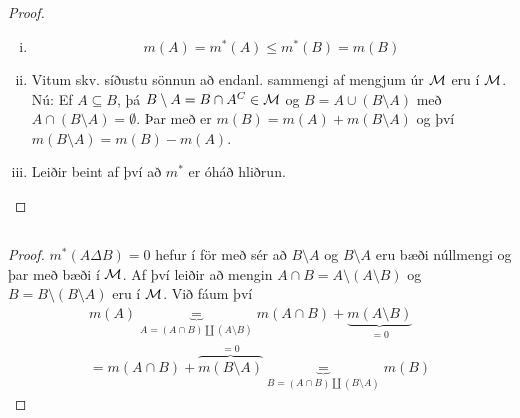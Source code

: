 \documentclass[12pt]{book} \usepackage[utf8]{inputenc}
\begin{document}
        \subsection{}
        \begin{proof}
          \begin{enumerate}[(i)]
          \item \[ m(A) = m^*(A) \leq m^*(B) = m(B) \]
          \item Vitum skv. síðustu sönnun að endanl. sammengi af
            mengjum úr $\mathcal{M}$ eru í $\mathcal{M}$.  Nú: Ef $A \subseteq B$,
            þá $B \setminus A = B \cap A^C \in \mathcal{M}$ og
            $B = A \cup (B \setminus A)$ með
            $A \cap (B \setminus A) = \emptyset$.  Þar með er
            $m(B) = m(A) + m(B \setminus A)$ og því
            $m(B \setminus A) = m(B) - m(A)$.

          \item Leiðir beint af því að $m^*$ er óháð hliðrun.
          \end{enumerate}
        \end{proof}

        \subsection{}
        \begin{proof}
          $m^*(A \Delta B) = 0$ hefur í för með sér að
          $B \setminus A$ og $B \setminus A$ eru bæði núllmengi og
          þar með bæði í $\mathcal{M}$. Af því leiðir að mengin
          $ A \cap B = A \setminus (A \setminus B) $ og
          $B = B \setminus (B \setminus A)$ eru í $\mathcal{M}$.  Við fáum
          því
          \begin{gather*}
            m(A) \underbrace{=}_{A = (A \cap B) \amalg (A
              \setminus B)} m( A \cap
            B) + \underbrace{m(A \setminus B)}_{= 0}\\
            = m(A \cap B) + \overbrace{m(B \setminus A)}^{= 0}
            \underbrace{=}_{B = (A \cap B) \amalg (B \setminus A)}
            m(B)
          \end{gather*}
        \end{proof}

        \subsection{}
\end{document}
